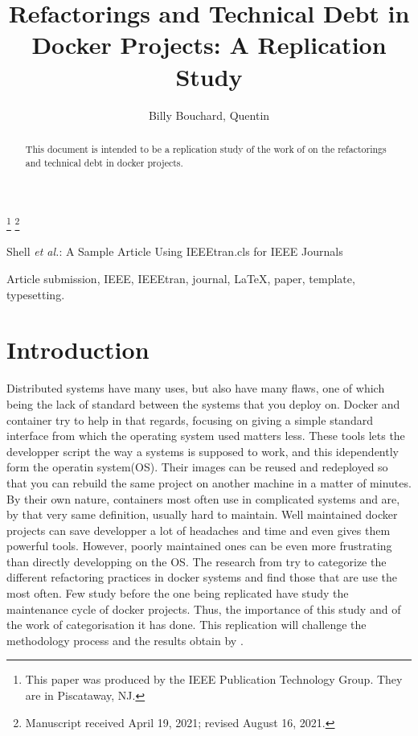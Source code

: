 \documentclass[lettersize,journal]{IEEEtran}
\begin{document}
\title{Refactorings and Technical Debt in Docker Projects: A Replication Study}

\author{Billy Bouchard, Quentin }
\thanks{This paper was produced by the IEEE Publication Technology Group. They are in Piscataway, NJ.}%
\thanks{Manuscript received April 19, 2021; revised August 16, 2021.}

%
{Shell \MakeLowercase{\textit{et al.}}: A Sample Article Using IEEEtran.cls for IEEE Journals}

\maketitle

\begin{abstract}
This document is intended to be a replication study of the work of \cite{1} on the refactorings and technical debt in docker projects.
\end{abstract}

\begin{IEEEkeywords}
Article submission, IEEE, IEEEtran, journal, \LaTeX, paper, template, typesetting.
\end{IEEEkeywords}

\section{Introduction}
Distributed systems have many uses, but also have many flaws, one of which being the lack of standard between the systems that you deploy on.
Docker and container try to help in that regards, focusing on giving a simple standard interface from which the operating system used matters less.
These tools lets the developper script the way a systems is supposed to work, and this idependently form the operatin system(OS).
Their images can be reused and redeployed so that you can rebuild the same project on another machine in a matter of minutes.
By their own nature, containers most often use in complicated systems and are, by that very same definition, usually hard to maintain.
Well maintained docker projects can save developper a lot of headaches and time and even gives them powerful tools.
However, poorly maintained ones can be even more frustrating than directly developping on the OS.
The research from \cite{1} try to categorize the different refactoring practices in docker systems and find those that are use the most often.
Few study before the one being replicated have study the maintenance cycle of docker projects.
Thus, the importance of this study and of the work of categorisation it has done.
This replication will challenge the methodology process and the results obtain by \cite{1}.  
\end{document}
